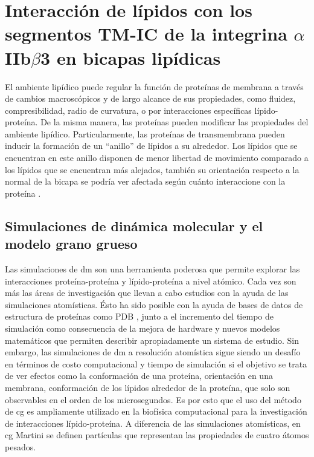 \chapter{Interacción de lípidos con los segmentos TM-IC de la integrina $\alpha$IIb$\beta$3 en bicapas lipídicas}\label{chap:dm}

El ambiente lipídico puede regular la función de proteínas de membrana a través de cambios macroscópicos y de largo alcance de sus propiedades, como fluidez, compresibilidad, radio de curvatura, o por interacciones específicas lípido-proteína. De la misma manera, las proteínas pueden modificar las propiedades del ambiente lipídico. Particularmente, las proteínas de transmembrana pueden inducir la formación de un ``anillo'' de lípidos a su alrededor. Los lípidos que se encuentran en este anillo disponen de menor libertad de movimiento comparado a los lípidos que se encuentran más alejados, también su orientación respecto a la normal de la bicapa se podría ver afectada según cuánto interaccione con la proteína \citep{Lee2011,Lee2003}.

\section{Simulaciones de dinámica molecular y el modelo grano grueso}

 Las simulaciones de \ac{dm} son una herramienta poderosa que permite explorar las interacciones proteína-proteína y lípido-proteína a nivel atómico. Cada vez son más las áreas de investigación que llevan a cabo estudios con la ayuda de las simulaciones atomísticas. Ésto ha sido posible con la ayuda de bases de datos de estructura de proteínas como PDB \citep{Berman2000}, junto a el incremento del tiempo de simulación como consecuencia de la mejora de hardware y nuevos modelos matemáticos que permiten describir apropiadamente un sistema de estudio. Sin embargo, las simulaciones de \ac{dm} a resolución atomística sigue siendo un desafío en términos de costo computacional y tiempo de simulación si el objetivo se trata de ver efectos como la conformación de una proteína, orientación en una membrana, conformación de los lípidos alrededor de la proteína, que solo son observables en el orden de los microsegundos. Es por esto que el uso del método de \acf{cg} es ampliamente utilizado en la biofísica computacional para la investigación de interacciones lípido-proteína. A diferencia de las simulaciones atomísticas, en \ac{cg} Martini se definen partículas que representan las propiedades de cuatro átomos pesados.
  
